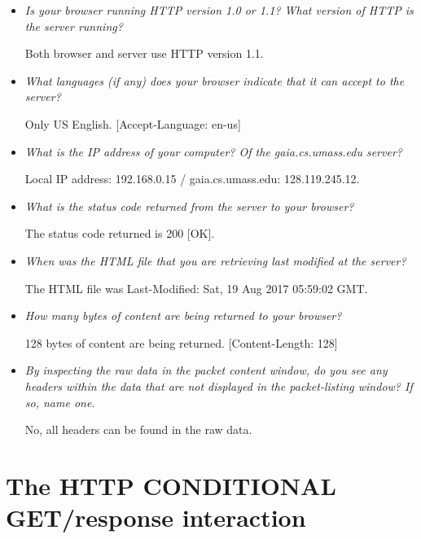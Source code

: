 \documentclass[11pt]{article}
\begin{document}
\begin{itemize}
	\setlength\itemsep{.5cm}

	\item
		\textit{Is your browser running HTTP version 1.0 or 1.1? What version of HTTP is the server running?}
		\par Both browser and server use HTTP version 1.1.
	
	\item
		\textit{What languages (if any) does your browser indicate that it can accept to the server?}
		\par Only US English. [Accept-Language: en-us]
	
	\item
		\textit{What is the IP address of your computer? Of the gaia.cs.umass.edu server?}
		\par Local IP address: 192.168.0.15 / gaia.cs.umass.edu: 128.119.245.12.
		
	\item
		\textit{What is the status code returned from the server to your browser?}
		\par The status code returned is 200 [OK].
		
	\item
		\textit{When was the HTML file that you are retrieving last modified at the server?}
		\par The HTML file was Last-Modified: Sat, 19 Aug 2017 05:59:02 GMT.
		
	\item
		\textit{How many bytes of content are being returned to your browser?}
		\par 128 bytes of content are being returned. [Content-Length: 128]
		
	\item
		\textit{By inspecting the raw data in the packet content window, do you see any headers within
the data that are not displayed in the packet-listing window? If so, name one.}
		\par No, all headers can be found in the raw data.
	
\end{itemize}

\pagebreak

\section{The HTTP CONDITIONAL GET/response interaction}
\end{document}
